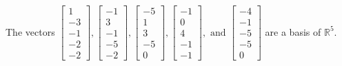 \begin{exercise}
\begin{exerciseStatement}
  \end{exerciseStatement}
  \begin{exerciseAnswer}
   The vectors \(\left[\begin{array}{r}
1 \\
-3 \\
-1 \\
-2 \\
-2
\end{array}\right] , \left[\begin{array}{r}
-1 \\
3 \\
-1 \\
-5 \\
-2
\end{array}\right] , \left[\begin{array}{r}
-5 \\
1 \\
3 \\
-5 \\
0
\end{array}\right] , \left[\begin{array}{r}
-1 \\
0 \\
4 \\
-1 \\
-1
\end{array}\right] , \text{ and } \left[\begin{array}{r}
-4 \\
-1 \\
-5 \\
-5 \\
0
\end{array}\right]\) 
  	 are  a basis of \(\mathbb{R}^5\).
  


  \end{exerciseAnswer}
\end{exercise}